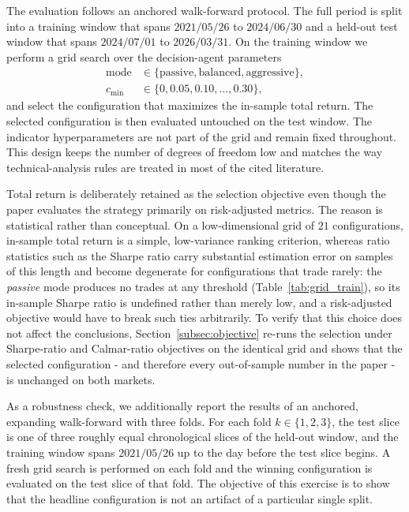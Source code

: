 \documentclass{ieeeaccess}
\begin{document}
The evaluation follows an anchored walk-forward protocol. The full period is split into a training window that spans $2021/05/26$ to $2024/06/30$ and a held-out test window that spans $2024/07/01$ to $2026/03/31$. On the training window we perform a grid search over the decision-agent parameters
\begin{equation}
\begin{aligned}
\mathrm{mode} &\in \{\text{passive}, \text{balanced}, \text{aggressive}\}, \\
c_{\min} &\in \{0, 0.05, 0.10, \ldots, 0.30\},
\end{aligned}
\end{equation}
and select the configuration that maximizes the in-sample total return. The selected configuration is then evaluated untouched on the test window. The indicator hyperparameters are not part of the grid and remain fixed throughout. This design keeps the number of degrees of freedom low and matches the way technical-analysis rules are treated in most of the cited literature.

Total return is deliberately retained as the selection objective even though the paper evaluates the strategy primarily on risk-adjusted metrics. The reason is statistical rather than conceptual. On a low-dimensional grid of $21$ configurations, in-sample total return is a simple, low-variance ranking criterion, whereas ratio statistics such as the Sharpe ratio carry substantial estimation error on samples of this length \cite{lo2002} and become degenerate for configurations that trade rarely: the \emph{passive} mode produces no trades at any threshold (Table~\ref{tab:grid_train}), so its in-sample Sharpe ratio is undefined rather than merely low, and a risk-adjusted objective would have to break such ties arbitrarily. To verify that this choice does not affect the conclusions, Section~\ref{subsec:objective} re-runs the selection under Sharpe-ratio and Calmar-ratio objectives on the identical grid and shows that the selected configuration - and therefore every out-of-sample number in the paper - is unchanged on both markets.

As a robustness check, we additionally report the results of an anchored, expanding walk-forward with three folds. For each fold $k \in \{1, 2, 3\}$, the test slice is one of three roughly equal chronological slices of the held-out window, and the training window spans $2021/05/26$ up to the day before the test slice begins. A fresh grid search is performed on each fold and the winning configuration is evaluated on the test slice of that fold. The objective of this exercise is to show that the headline configuration is not an artifact of a particular single split.
\end{document}
